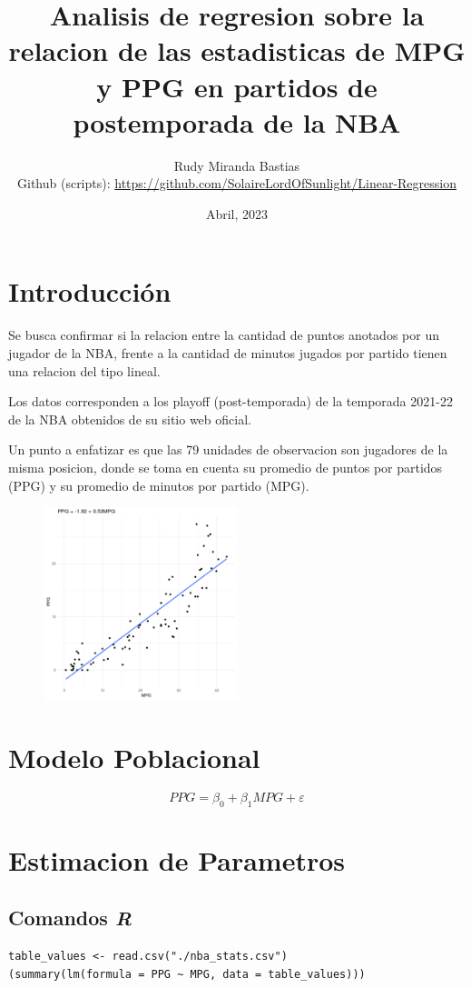 \documentclass[onecolumn]{IEEEtran}
\title{Analisis de regresion sobre la relacion de las estadisticas de MPG y PPG en partidos de postemporada de la NBA}
\author{Rudy Miranda Bastias\\
    Github (scripts): \url{https://github.com/SolaireLordOfSunlight/Linear-Regression}
}
\date{Abril, 2023}
\begin{document}
    \maketitle

    \section{Introducci\'on}
    Se busca confirmar si la relacion entre la cantidad de puntos anotados por un jugador de la NBA, frente a la cantidad de minutos jugados por partido tienen una relacion del tipo lineal.

    Los datos corresponden a los playoff (post-temporada) de la temporada 2021-22 de la NBA obtenidos de su sitio web oficial.

    Un punto a enfatizar es que las 79 unidades de  observacion son jugadores de la misma posicion, donde se toma en cuenta su promedio de puntos por partidos (PPG) y su promedio de minutos por partido (MPG).

    \begin{figure}[h]
       \centering
       \includegraphics[width=0.5\textwidth]{../plot1.png}
    \end{figure}
    \section{Modelo Poblacional}
    
    \begin{equation}
        PPG = \beta_0 + \beta_1 MPG + \varepsilon        
    \end{equation}
    
    \section{Estimacion de Parametros}
    \subsection*{Comandos \textit{R}}
    \begin{verbatim}
table_values <- read.csv("./nba_stats.csv")
(summary(lm(formula = PPG ~ MPG, data = table_values)))
    \end{verbatim}
    \newpage
\end{document}
